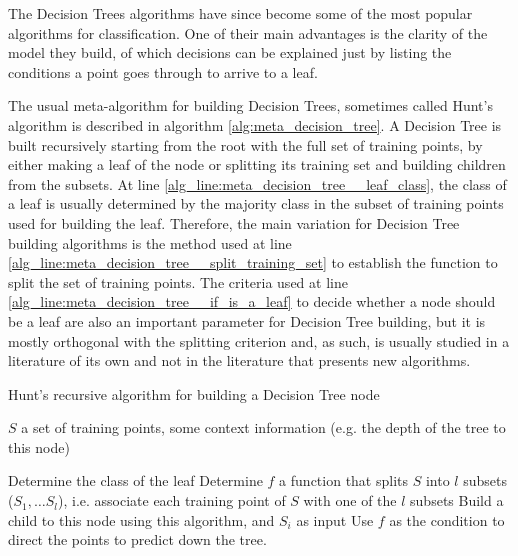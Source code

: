 The Decision Trees algorithms have since become some of the most popular algorithms for classification. One of their main advantages is the clarity of the model they build, of which decisions can be explained just by listing the conditions a point goes through to arrive to a leaf.

The usual meta-algorithm for building Decision Trees, sometimes called Hunt's algorithm \cite{Priyanka2020_decision_trees_survey} is described in algorithm \ref{alg:meta_decision_tree}. A Decision Tree is built recursively starting from the root with the full set of training points, by either making a leaf of the node or splitting its training set and building children from the subsets.
At line \ref{alg_line:meta_decision_tree__leaf_class}, the class of a leaf is usually determined by the majority class in the subset of training points used for building the leaf. Therefore, the main variation for Decision Tree building algorithms is the method used at line \ref{alg_line:meta_decision_tree__split_training_set} to establish the function to split the set of training points. The criteria used at line \ref{alg_line:meta_decision_tree__if_is_a_leaf} to decide whether a node should be a leaf are also an important parameter for Decision Tree building, but it is mostly orthogonal with the splitting criterion and, as such, is usually studied in a literature of its own and not in the literature that presents new algorithms.

\begin{algorithm}
\caption{Hunt's recursive algorithm for building a Decision Tree node}
\label{alg:meta_decision_tree}
\begin{algorithmic}[1]
    \Require $S$ a set of training points, some context information (e.g. the depth of the tree to this node)
    
        \State Determine the class of the leaf \label{alg_line:meta_decision_tree__leaf_class}
    \Else
        \State Determine $f$ a function that splits $S$ into $l$ subsets ($S_1, \dots S_l$), i.e. associate each training point of $S$ with one of the $l$ subsets\label{alg_line:meta_decision_tree__split_training_set}
            \State Build a child to this node using this algorithm, and $S_i$ as input\label{alg_line:meta_decision_tree__build_children}
        \EndFor
        \State Use $f$ as the condition to direct the points to predict down the tree.
    \EndIf
\end{algorithmic}
\end{algorithm}

